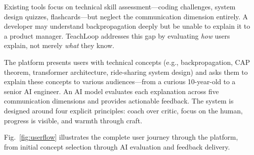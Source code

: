 \documentclass[11pt]{article}
\begin{document}
Existing tools focus on technical skill assessment---coding challenges, system design quizzes, flashcards---but neglect the communication dimension entirely. A developer may understand backpropagation deeply but be unable to explain it to a product manager. TeachLoop addresses this gap by evaluating \emph{how} users explain, not merely \emph{what} they know.

The platform presents users with technical concepts (e.g., backpropagation, CAP theorem, transformer architecture, ride-sharing system design) and asks them to explain these concepts to various audiences---from a curious 10-year-old to a senior AI engineer. An AI model evaluates each explanation across five communication dimensions and provides actionable feedback. The system is designed around four explicit principles: coach over critic, focus on the human, progress is visible, and warmth through craft.

Fig.~\ref{fig:userflow} illustrates the complete user journey through the platform, from initial concept selection through AI evaluation and feedback delivery.
\end{document}
